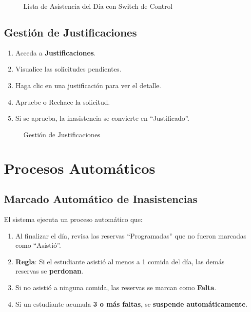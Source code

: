 \documentclass[12pt,a4paper]{article}
\begin{document}
\begin{figure}[h]
    \centering
    \caption{Lista de Asistencia del Día con Switch de Control}
    \label{fig:asistencia_hoy}
\end{figure}

\subsection{Gestión de Justificaciones}
\begin{enumerate}
    \item Acceda a \textbf{Justificaciones}.
    \item Visualice las solicitudes pendientes.
    \item Haga clic en una justificación para ver el detalle.
    \item Apruebe o Rechace la solicitud.
    \item Si se aprueba, la inasistencia se convierte en ``Justificado''.
\end{enumerate}

\begin{figure}[h]
    \centering
    \caption{Gestión de Justificaciones}
    \label{fig:gestionar_justificaciones}
\end{figure}

\section{Procesos Automáticos}

\subsection{Marcado Automático de Inasistencias}
El sistema ejecuta un proceso automático que:

\begin{enumerate}
    \item Al finalizar el día, revisa las reservas ``Programadas'' que no fueron marcadas como ``Asistió''.
    \item \textbf{Regla}: Si el estudiante asistió al menos a 1 comida del día, las demás reservas se \textbf{perdonan}.
    \item Si no asistió a ninguna comida, las reservas se marcan como \textbf{Falta}.
    \item Si un estudiante acumula \textbf{3 o más faltas}, se \textbf{suspende automáticamente}.
\end{enumerate}
\end{document}
